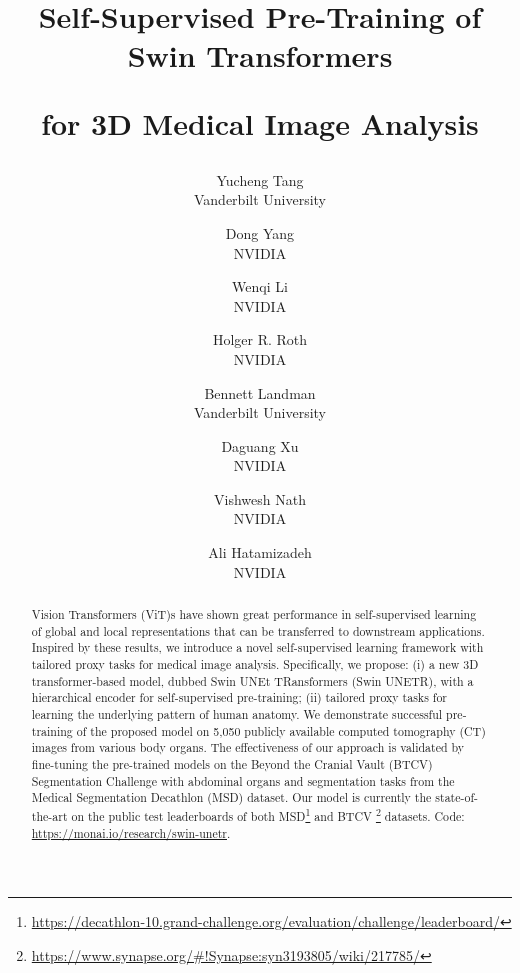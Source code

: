\documentclass[10pt,twocolumn,letterpaper]{article}
\begin{document}
\title{\Large Self-Supervised Pre-Training of Swin Transformers 

for 3D Medical Image Analysis}



\author{
Yucheng Tang\\
Vanderbilt University\\
\and
Dong Yang\\
NVIDIA\\
\and
Wenqi Li\\
NVIDIA\\
\and
Holger R. Roth\\
NVIDIA\\
\and
Bennett Landman\\
Vanderbilt University\\
\and
Daguang Xu\\
NVIDIA\\
\and
Vishwesh Nath\\
NVIDIA\\
\and
Ali Hatamizadeh\\
NVIDIA\\
}



\maketitle
\def\thefootnote{}\def\thefootnote{\arabic{footnote}}
\def\thefootnote{}\def\thefootnote{\arabic{footnote}}
\def\thefootnote{}\def\thefootnote{\arabic{footnote}}

\begin{abstract}
   Vision Transformers (ViT)s have shown great performance in self-supervised learning of global and local representations that can be transferred to downstream applications. Inspired by these results, we introduce a novel self-supervised learning framework with tailored proxy tasks for medical image analysis. Specifically, we propose: (i) a new 3D transformer-based model, dubbed Swin UNEt TRansformers (Swin UNETR), with a hierarchical encoder for self-supervised pre-training; (ii) tailored proxy tasks for learning the underlying pattern of human anatomy. We demonstrate successful pre-training of the proposed model on 5,050 publicly available computed tomography (CT) images from various body organs. The effectiveness of our approach is validated by fine-tuning the pre-trained models on the Beyond the Cranial Vault (BTCV) Segmentation Challenge with  abdominal organs and segmentation tasks from the Medical Segmentation Decathlon (MSD) dataset. Our model is currently the state-of-the-art on the public test leaderboards of both MSD\footnote{{\url{https://decathlon-10.grand-challenge.org/evaluation/challenge/leaderboard/}}} and BTCV \footnote{{\url{https://www.synapse.org/\#!Synapse:syn3193805/wiki/217785/}}} datasets. Code: \href{https://monai.io/research/swin-unetr}{https://monai.io/research/swin-unetr}.
\end{abstract}
\end{document}
